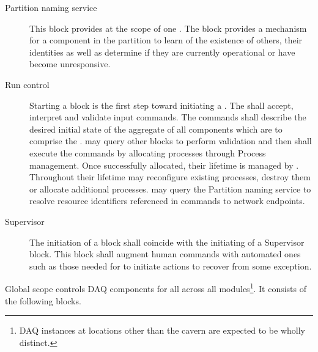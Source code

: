 \begin{description}
\item[Partition naming service] This block provides  at the scope of one . 
  The block provides a mechanism for a component in the partition to learn of the existence of others, their identities as well as determine if they are currently operational or have become unresponsive.

\item[Run control] Starting a  block is the first step toward initiating a . 
  The  shall accept, interpret and validate input commands.  The commands shall describe the desired initial state of the aggregate of all components which are to comprise the .   may query other blocks to perform validation and then shall execute the commands by allocating processes through Process management.  Once successfully allocated, their lifetime is managed by .  Throughout their lifetime  may reconfigure existing processes, destroy them or allocate additional processes.   may query the Partition naming service to resolve resource identifiers referenced in commands to network endpoints.  

\item[Supervisor] The initiation of a  block shall coincide with the initiating of a Supervisor block.  This block shall augment human commands with automated ones such as those needed for  to initiate actions to recover from some exception.

\end{description}

Global scope controls DAQ components for all  across all  modules\footnote{DAQ instances at locations other than the  cavern are expected to be wholly distinct.}.  It consists of the following blocks.


